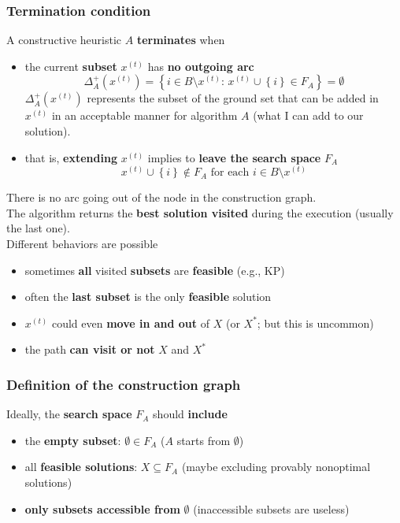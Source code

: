 \newpage

\subsubsection{Termination condition} 
A constructive heuristic $A$ \textbf{terminates} when
\begin{itemize}
	\item the current \textbf{subset} $x^{(t)}$ has \textbf{no outgoing arc}
	$$ \Delta^+_A \left(x^{(t)}\right) = \left\{i \in B \setminus x^{(t)} : \, x^{(t)} \cup \left\{i\right\} \in F_A \right\} = \emptyset $$
	$\Delta^+_A \left(x^{(t)}\right)$ represents the subset of the ground set that can be added in $x^{(t)}$ in an acceptable manner for algorithm $A$ (what I can add to our solution).\\
	
	\item that is, \textbf{extending} $x^{(t)}$ implies to \textbf{leave the search space} $F_A$
	$$ x^{(t)} \cup \left\{i\right\} \notin F_A \text{ for each } i \in B \setminus x^{(t)}$$
\end{itemize}

There is no arc going out of the node in the construction graph.\\

The algorithm returns the \textbf{best solution visited} during the execution (usually the last one).\\

Different behaviors are possible
\begin{itemize}
	\item sometimes \textbf{all} visited \textbf{subsets} are \textbf{feasible} (e.g., KP)
	\item often the \textbf{last subset} is the only \textbf{feasible} solution
	\item $x^{(t)}$ could even \textbf{move in and out} of $X$ (or $X^\ast$; but this is uncommon)
	\item the path \textbf{can visit or not} $X$ and $X^\ast$
\end{itemize}

\newpage

\subsubsection{Definition of the construction graph}
Ideally, the \textbf{search space} $F_A$ should \textbf{include}
\begin{itemize}
	\item the \textbf{empty subset}: $\emptyset \in F_A$ ($A$ starts from $\emptyset$)
	\item all \textbf{feasible solutions}: $X \subseteq F_A$ (maybe excluding provably nonoptimal solutions)
	\item \textbf{only subsets accessible from} $\emptyset$ (inaccessible subsets are useless)
\end{itemize}

